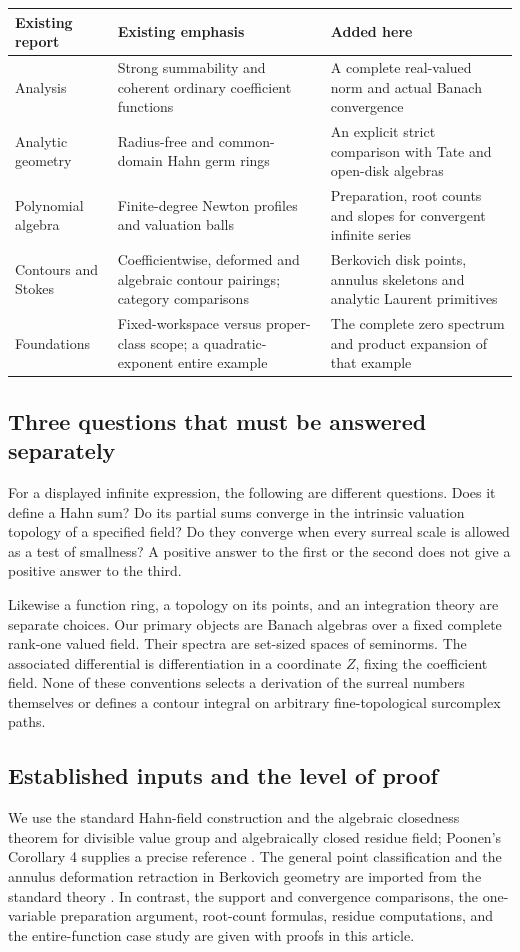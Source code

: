 \documentclass[11pt,a4paper]{article}
\numberwithin{equation}{section}
\theoremstyle{definition}
\theoremstyle{remark}
\begin{document}
\begin{center}\small
\begin{tabularx}{\textwidth}{@{}P{0.24\textwidth}LL@{}}
\toprule
Existing report & Existing emphasis & Added here\\\midrule
Analysis & Strong summability and coherent ordinary coefficient functions
 & A complete real-valued norm and actual Banach convergence\\[0.5em]
Analytic geometry & Radius-free and common-domain Hahn germ rings
 & An explicit strict comparison with Tate and open-disk algebras\\[0.5em]
Polynomial algebra & Finite-degree Newton profiles and valuation balls
 & Preparation, root counts and slopes for convergent infinite series\\[0.5em]
Contours and Stokes & Coefficientwise, deformed and algebraic contour pairings;
 category comparisons
 & Berkovich disk points, annulus skeletons and analytic Laurent primitives\\[0.5em]
Foundations & Fixed-workspace versus proper-class scope; a quadratic-exponent
 entire example
 & The complete zero spectrum and product expansion of that example\\
\bottomrule
\end{tabularx}
\end{center}

\subsection{Three questions that must be answered separately}
For a displayed infinite expression, the following are different questions.
Does it define a Hahn sum? Do its partial sums converge in the intrinsic
valuation topology of a specified field? Do they converge when every surreal
scale is allowed as a test of smallness? A positive answer to the first or the
second does not give a positive answer to the third.

Likewise a function ring, a topology on its points, and an integration theory are
separate choices. Our primary objects are Banach algebras over a fixed complete
rank-one valued field. Their spectra are set-sized spaces of seminorms. The
associated differential is differentiation in a coordinate $Z$, fixing the
coefficient field. None of these conventions selects a derivation of the surreal
numbers themselves or defines a contour integral on arbitrary fine-topological
surcomplex paths.

\subsection{Established inputs and the level of proof}
We use the standard Hahn-field construction and the algebraic closedness theorem
for divisible value group and algebraically closed residue field; Poonen's
Corollary 4 supplies a precise reference \cite{Poonen}. The general point
classification and the annulus deformation retraction in Berkovich geometry
are imported from the standard theory \cite{Temkin,PT}. In contrast, the
support and convergence comparisons, the one-variable preparation argument,
root-count formulas, residue computations, and the entire-function case study
are given with proofs in this article.
\end{document}

